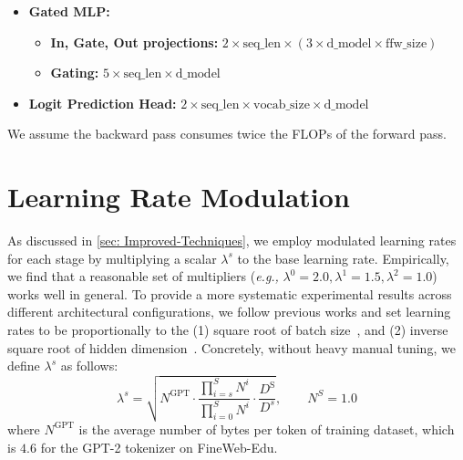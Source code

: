 \documentclass{article}
\newcommand{\citep}{\parencite}
\newcommand{\eg}{\emph{e.g.,}}
\theoremstyle{plain}
\theoremstyle{remark}
\begin{document}
\begin{itemize}
\begin{itemize}
            \item \textbf{Depthwise Convolution:} $2 \times \text{seq\_len} \times \text{d\_model} \times \text{window\_size}$
            \item \textbf{Gating:} $5 \times \text{seq\_len} \times \text{d\_model}$
            \item \textbf{Output projection:} $2 \times \text{seq\_len} \times \text{d\_model} \times \text{d\_model}$
        \end{itemize}
    \item \textbf{Gated MLP:}
        \begin{itemize}
            \item \textbf{In, Gate, Out projections:} $2 \times \text{seq\_len} \times (3 \times \text{d\_model} \times \text{ffw\_size})$
            \item \textbf{Gating:} $5 \times \text{seq\_len} \times \text{d\_model}$
        \end{itemize}
    \item \textbf{Logit Prediction Head:} $2 \times \text{seq\_len} \times \text{vocab\_size} \times \text{d\_model}$
\end{itemize}
We assume the backward pass consumes twice the FLOPs of the forward pass.

\section{Learning Rate Modulation}
\label{sec: appendix-lr_modulation}
As discussed in \cref{sec: Improved-Techniques}, we employ modulated learning rates for each stage by multiplying a scalar $\lambda^s$ to the base learning rate.
Empirically, we find that a reasonable set of multipliers (\eg{} $\lambda^0=2.0, \lambda^1=1.5, \lambda^2=1.0$) works well in general.
To provide a more systematic experimental results across different architectural configurations, we follow previous works and set learning rates to be proportionally to the (1) square root of batch size~\citep{malladi2022sdes,OLMo}, and (2) inverse square root of hidden dimension~\citep{Transformer,yang2020feature}.
Concretely, without heavy manual tuning, we define $\lambda^s$ as follows:
\begin{equation}
    \lambda^s = \sqrt{N^\text{GPT} \cdot \dfrac{\prod_{i=s}^{S} N^i}{\prod_{i=0}^{S} N^i} \cdot \dfrac{D^\text{S}}{D^s}}, \qquad N^S = 1.0
\end{equation}
where $N^\text{GPT}$ is the average number of bytes per token of training dataset, which is $4.6$ for the GPT-2 tokenizer on FineWeb-Edu.
\end{document}
